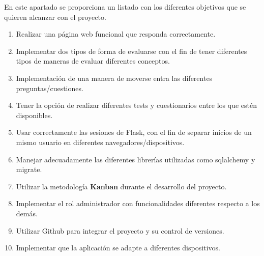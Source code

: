 
En este apartado se proporciona un listado con los diferentes objetivos que se quieren alcanzar con el proyecto.
\begin{enumerate}
    \item Realizar una página web funcional que responda correctamente.
    \item Implementar dos tipos de forma de evaluarse con el fin de tener diferentes tipos de maneras de evaluar diferentes conceptos.
    \item Implementación de una manera de moverse entra las diferentes preguntas/cuestiones.
    \item Tener la opción de realizar diferentes tests y cuestionarios entre los que estén  disponibles.
    \item Usar correctamente las sesiones de Flask, con el fin de separar inicios de un mismo usuario en diferentes navegadores/dispositivos.
    \item Manejar adecuadamente las diferentes librerías utilizadas como sqlalchemy y migrate.
    \item Utilizar la metodología \textbf{Kanban} durante el desarrollo del proyecto.
    \item Implementar el rol administrador con funcionalidades diferentes respecto a los demás.
    \item Utilizar Github para integrar el proyecto y su control de versiones.
    \item Implementar que la aplicación se adapte a diferentes dispositivos.
\end{enumerate}
